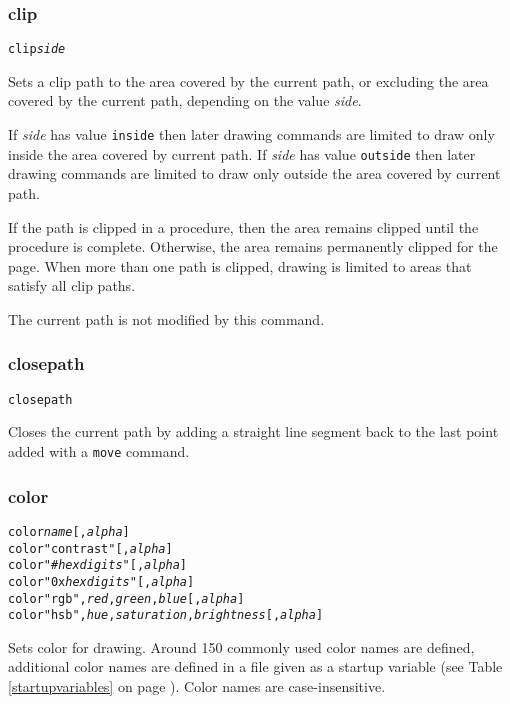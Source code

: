 \subsubsection{clip}

\begin{alltt}
clip \textit{side}
\end{alltt}

Sets a clip path to the area covered by the current path,
or excluding the area covered by the current path, depending
on the value \textit{side}.

If \textit{side} has value \texttt{inside} then
later drawing commands are limited to draw only inside the area
covered by current path.
If \textit{side} has value \texttt{outside} then
later drawing commands are limited to draw only outside the area
covered by current path.

If the path is clipped in a procedure, then the area remains
clipped until the procedure is complete.  Otherwise, the area
remains permanently clipped for the page.
When more than one path is clipped, drawing is limited to
areas that satisfy all clip paths.

The current path is not modified by this command.

\subsubsection{closepath}

\begin{alltt}
closepath
\end{alltt}

Closes the current path by adding a straight line segment
back to the last point added with a \texttt{move} command.

\subsubsection{color}

\begin{alltt}
color \textit{name} [, \textit{alpha}]
color "contrast" [, \textit{alpha}]
color "\#\textit{hexdigits}" [, \textit{alpha}]
color "0x\textit{hexdigits}" [, \textit{alpha}]
color "rgb", \textit{red}, \textit{green}, \textit{blue} [, \textit{alpha}]
color "hsb", \textit{hue}, \textit{saturation}, \textit{brightness} [, \textit{alpha}]
\end{alltt}

Sets color for drawing.  Around 150 commonly used color names are defined,
additional color names are defined in a file given as a startup variable (see
Table \ref{startupvariables} on page \pageref{startupvariables}).
Color names are case-insensitive.

